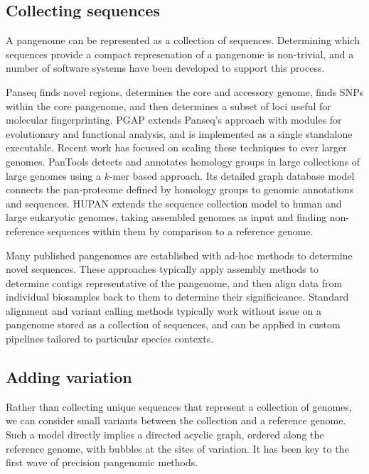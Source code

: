 \subsection{Collecting sequences}

A pangenome can be represented as a collection of sequences.
Determining which sequences provide a compact represenation of a pangenome is non-trivial, and a number of software systems have been developed to support this process.

Panseq \cite{Laing_2010} finds novel regions, determines the core and accessory genome, finds SNPs within the core pangenome, and then determines a subset of loci useful for molecular fingerprinting.
PGAP \cite{Zhao_2011} extends Panseq's approach with modules for evolutionary and functional analysis, and is implemented as a single standalone executable.
Recent work has focused on scaling these techniques to ever larger genomes.
PanTools \cite{Sheikhizadeh_Anari_2018} detects and annotates homology groups in large collections of large genomes using a $k$-mer based approach.
Its detailed graph database model connects the pan-proteome defined by homology groups to genomic annotations and sequences.
HUPAN \citep{Duan_2019} extends the sequence collection model to human and large eukaryotic genomes, taking assembled genomes as input and finding non-reference sequences within them by comparison to a reference genome.

Many published pangenomes are established with ad-hoc methods to determine novel sequences.
These approaches typically apply assembly methods to determine contigs representative of the pangenome, and then align data from individual biosamples back to them to determine their significicance.
Standard alignment and variant calling methods typically work without issue on a pangenome stored as a collection of sequences, and can be applied in custom pipelines tailored to particular species contexts.

\subsection{Adding variation}

Rather than collecting unique sequences that represent a collection of genomes, we can consider small variants between the collection and a reference genome.
Such a model directly implies a directed acyclic graph, ordered along the reference genome, with bubbles at the sites of variation.
It has been key to the first wave of precision pangenomic methods.

